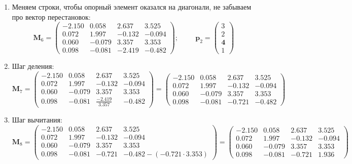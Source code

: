 \begin{enumerate}
    \item Меняем строки, чтобы опорный элемент оказался на диагонали, не забываем про вектор перестановок:
    \[\mathbf{M}_6 =
     \begin{pmatrix}
         -2.150&  0.058&  2.637&  3.525\\
         0.072&  1.997& -0.132& -0.094\\
        \mathbf{ 0.060}& \mathbf{-0.079}&  \mathbf{3.357}& \mathbf{ 3.353}\\
        \mathit{ 0.098}& \mathit{-0.081}& \mathit{-2.419}& \mathit{-0.482}
     \end{pmatrix}; \hspace{1cm}
     \mathbf{p}_2 = \begin{pmatrix} 3 \\ 2 \\ \mathbf{4} \\ \mathit{1}  \end{pmatrix}\]

     \item Шаг деления:
     \[\mathbf{M}_7 =
     \begin{pmatrix}
        -2.150&  0.058&  2.637&  3.525\\
         0.072&  1.997& -0.132& -0.094\\
         0.060& -0.079&  \mathbf{3.357}&  3.353\\
         0.098& -0.081& \frac{-2.419}{3.357}& -0.482
     \end{pmatrix} =
     \begin{pmatrix}
         -2.150&  0.058&  2.637&  3.525\\
         0.072&  1.997& -0.132& -0.094\\
         0.060& -0.079&  3.357&  3.353\\
         0.098& -0.081& \mathit{-0.721}& -0.482
     \end{pmatrix}\]

     \item Шаг вычитания:
     \[\mathbf{M}_8 =
     \begin{pmatrix}
         -2.150&  0.058&  2.637&  3.525\\
         0.072&  1.997& -0.132& -0.094\\
         0.060& -0.079&  3.357&  \mathbf{3.353}\\
         0.098& -0.081& \mathit{-0.721}& -0.482-(-0.721\cdot3.353)
     \end{pmatrix} =
     \begin{pmatrix}
         -2.150&  0.058&  2.637&  3.525\\
         0.072&  1.997& -0.132& -0.094\\
         0.060& -0.079&  3.357&  3.353\\
         0.098& -0.081& -0.721& 1.936
     \end{pmatrix}\]
\end{enumerate}
